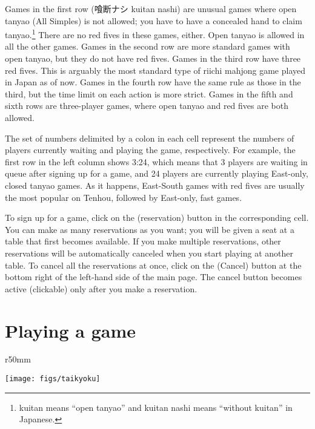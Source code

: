 Games in the first row (喰断ナシ {\jap kuitan nashi}) are unusual games where open {\jap tanyao} (All Simples) is not allowed; you have to have a concealed hand to claim {\jap tanyao}.\footnote{{\jap kuitan} means ``open {\jap tanyao}'' and {\jap kuitan nashi} means ``without {\jap kuitan}'' in Japanese.} There are no red fives in these games, either. 
Open {\jap tanyao} is allowed in all the other games. Games in the second row are more standard games with open {\jap tanyao}, but they do not have red fives. 
Games in the third row have three red fives. This is arguably the most standard type of riichi mahjong game played in Japan as of now. 
Games in the fourth row have the same rule as those in the third, but the time limit on each action is more strict. 
Games in the fifth and sixth rows are three-player games, where open {\jap tanyao} and red fives are both allowed. 

\bigskip
The set of numbers delimited by a colon in each cell represent the numbers of players currently waiting and playing the game, respectively. For example, the first row in the left column shows 3:24, which means that 3 players are waiting in queue after signing up for a game, and 24 players are currently playing East-only, closed {\jap tanyao} games. As it happens, East-South games with red fives are usually the most popular on {\jap Tenhou}, followed by East-only, fast games. 

\bigskip
To sign up for a game, click on the  (reservation) button in the corresponding cell. You can make as many reservations as you want; you will be given a seat at a table that first becomes available. If you make multiple reservations, other reservations will be automatically canceled when you start playing at another table. To cancel all the reservations at once, click on the  (Cancel) button at the bottom right of the left-hand side of the main page. The cancel button becomes active (clickable) only after you make a reservation. 

\newpage
\section{Playing a game}

\begin{wrapfigure}{r}{50mm}
\vspace{-20pt}
\begin{center}
\texttt{[image: figs/taikyoku]}
\end{center}
\vspace{-20pt}
\end{wrapfigure}

